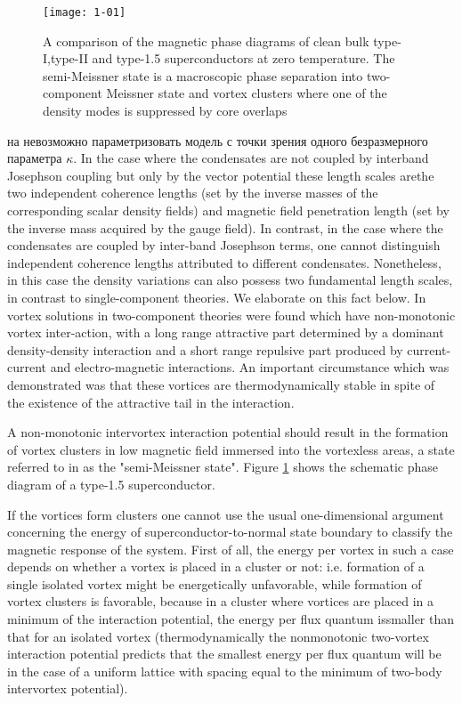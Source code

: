 \begin{figure}[h!]
  \texttt{[image: 1-01]}
  \caption{A comparison of the magnetic phase diagrams of
    clean bulk type-I,type-II and type-1.5 superconductors at
    zero temperature. The semi-Meissner state is a macroscopic
    phase separation into two-component Meissner state and vortex
    clusters where one of the density modes is suppressed by
    core overlaps}
  \label{fig:1}
\end{figure}

на невозможно параметризовать модель с точки зрения одного безразмерного 
параметра \( \kappa \). In the case where the condensates are not coupled by 
interband Josephson coupling but only by the vector potential these length 
scales arethe two independent coherence lengths (set by the inverse masses of 
the corresponding scalar density fields) and magnetic field penetration length 
(set by the inverse mass acquired by the gauge field). In contrast, in the 
case where the condensates are coupled by inter-band Josephson terms, one 
cannot distinguish independent coherence lengths attributed to different 
condensates. Nonetheless, in this case the density variations can also possess 
two fundamental length scales\cite{bib:2}, in contrast to single-component 
theories. We elaborate on this fact below. In \cite{bib:1,bib:2} vortex 
solutions in two-component theories were found which have non-monotonic 
vortex inter-action, with a long range attractive part determined by a 
dominant density-density interaction and a short range repulsive part produced 
by current-current and electro-magnetic interactions. An important 
circumstance which was demonstrated was that these vortices are 
thermodynamically stable in spite of the existence of the attractive tail in 
the interaction.

A non-monotonic intervortex interaction potential should result in the 
formation of vortex clusters in low magnetic field immersed into the 
vortexless areas, a state referred to in \cite{bib:1} as the "semi-Meissner 
state". Figure \ref{fig:1} shows the schematic phase diagram of a type-1.5 
superconductor.

If the vortices form clusters one cannot use the usual one-dimensional 
argument concerning the energy of superconductor-to-normal state boundary to 
classify the magnetic response of the system. First of all, the energy per 
vortex in such a case depends on whether a vortex is placed in a cluster or 
not: i.e. formation of a single isolated vortex might be energetically 
unfavorable, while formation of vortex clusters is favorable, because in a 
cluster where vortices are placed in a minimum of the interaction potential, 
the energy per flux quantum issmaller than that for an isolated vortex 
(thermodynamically the nonmonotonic two-vortex interaction potential predicts 
that the smallest energy per flux quantum will be in the case of a uniform 
lattice with spacing equal to the minimum of two-body intervortex potential).

